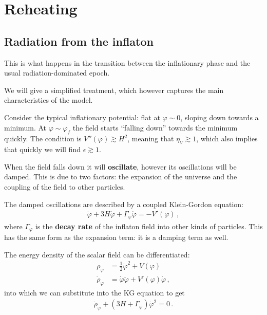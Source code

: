 \documentclass[main.tex]{subfiles}
\begin{document}
\chapter{Reheating}

\section{Radiation from the inflaton}


This is what happens in the transition between the inflationary phase and the usual radiation-dominated epoch. 

We will give a simplified treatment, which however captures the main characteristics of the model.

Consider the typical inflationary potential: flat at \(\varphi \sim 0\), sloping down towards a minimum. At \(\varphi \sim \varphi _f\) the field starts ``falling down'' towards the minimum quickly.
The condition is \(V''(\varphi ) \gtrsim H^2\), meaning that \(\eta _V \gtrsim 1\), which also implies that quickly we will find \(\epsilon \gtrsim 1\). 

When the field falls down it will \textbf{oscillate}, however its oscillations will be damped.
This is due to two factors: the expansion of the universe and the coupling of the field to other particles. 

The damped oscillations are described by a coupled Klein-Gordon equation: 
%
\begin{align}
\ddot{\varphi} + 3 H \dot{\varphi} + \Gamma _\varphi \dot{\varphi} = - V' (\varphi )
\,,
\end{align}
%
where \(\Gamma _\varphi \) is the \textbf{decay rate} of the inflaton field into other kinds of particles. 
This has the same form as the expansion term: it is a damping term as well.

The energy density of the scalar field can be differentiated:
%
\begin{align}
\rho _\varphi &= \frac{1}{2} \dot{\varphi}^2 + V(\varphi )  \label{eq:scalar-field-energy-density}\\
\dot{\rho}_\varphi &= \dot{\varphi} \ddot{\varphi} + V' (\varphi ) \dot{\varphi}
\,,
\end{align}
%
into which we can substitute into the KG equation to get
%
\begin{align}
\dot{\rho}_\varphi + (3 H + \Gamma _\varphi ) \dot{\varphi}^2 = 0
\,.
\end{align}
\end{document}
